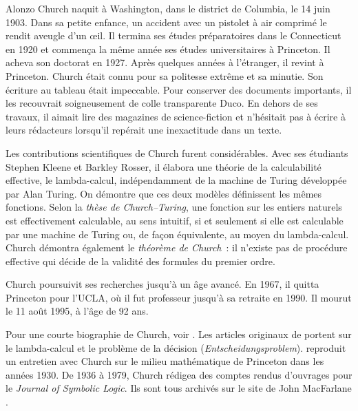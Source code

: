 \documentclass[../../../include/open-logic-section]{subfiles}
\begin{document}



Alonzo Church naquit
à Washington,
dans le district
de Columbia,
le 14 juin 1903.
Dans sa petite enfance,
un accident avec
un pistolet à
air comprimé
le rendit aveugle
d'un œil.
Il termina ses
études préparatoires
dans le Connecticut
en 1920 et
commença la même
année ses études
universitaires
à Princeton.
Il acheva son
doctorat en 1927.
Après quelques
années à l'étranger,
il revint à
Princeton.
Church était
connu pour sa
politesse extrême
et sa minutie.
Son écriture
au tableau
était impeccable.
Pour conserver
des documents
importants,
il les recouvrait
soigneusement
de colle
transparente
Duco.
En dehors de
ses travaux,
il aimait lire
des magazines
de science-fiction
et n'hésitait
pas à écrire
à leurs rédacteurs
lorsqu'il repérait
une inexactitude
dans un texte.

Les contributions
scientifiques
de Church
furent considérables.
Avec ses étudiants
Stephen Kleene
et Barkley Rosser,
il élabora
une théorie
de la calculabilité
effective, le
lambda-calcul,
indépendamment
de la machine
de Turing
développée par
Alan Turing.
On démontre que ces deux modèles définissent les mêmes
fonctions. Selon la \emph{thèse de
Church--Turing}, une fonction sur les entiers naturels est
effectivement calculable, au sens intuitif, si et seulement
si elle est calculable par une machine de Turing ou, de façon
équivalente, au moyen du lambda-calcul. Church démontra
également le \emph{théorème de
Church}~: il n'existe pas de procédure effective qui décide
de la validité des formules du premier ordre.

Church poursuivit
ses recherches
jusqu'à un
âge avancé.
En 1967,
il quitta
Princeton pour
l'UCLA, où
il fut professeur
jusqu'à sa
retraite en 1990.
Il mourut
le 11 août 1995,
à l'âge
de 92 ans.

\begin{reading}
Pour une courte
biographie de Church,
voir \citet{EndertonND}.
Les articles originaux de
\citet{Church1936,Church1936a} portent sur le lambda-calcul
et le problème de la décision (\emph{Entscheidungsproblem}).
\citet{Aspray1984}
reproduit un entretien
avec Church sur
le milieu mathématique
de Princeton
dans les années 1930.
De 1936 à 1979,
Church rédigea
des comptes rendus
d'ouvrages pour
le \emph{Journal of
Symbolic Logic}.
Ils sont tous
archivés sur
le site de
John MacFarlane
\citep{MacFarlane2015}.
\end{reading}
\end{document}
